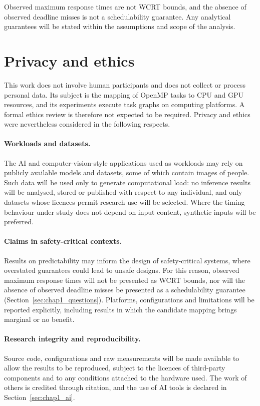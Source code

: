 Observed maximum response times are not WCRT bounds, and the absence of observed deadline misses is not a schedulability guarantee. Any analytical guarantees will be stated within the assumptions and scope of the analysis.

\section{Privacy and ethics}
\label{sec:chap1_ethics}
This work does not involve human participants and does not collect or process personal data. Its subject is the mapping of OpenMP tasks to CPU and GPU resources, and its experiments execute task graphs on computing platforms. A formal ethics review is therefore not expected to be required. Privacy and ethics were nevertheless considered in the following respects.

\paragraph{Workloads and datasets.} The AI and computer-vision-style applications used as workloads may rely on publicly available models and datasets, some of which contain images of people. Such data will be used only to generate computational load: no inference results will be analysed, stored or published with respect to any individual, and only datasets whose licences permit research use will be selected. Where the timing behaviour under study does not depend on input content, synthetic inputs will be preferred.

\paragraph{Claims in safety-critical contexts.} Results on predictability may inform the design of safety-critical systems, where overstated guarantees could lead to unsafe designs. For this reason, observed maximum response times will not be presented as WCRT bounds, nor will the absence of observed deadline misses be presented as a schedulability guarantee (Section~\ref{sec:chap1_questions}). Platforms, configurations and limitations will be reported explicitly, including results in which the candidate mapping brings marginal or no benefit.

\paragraph{Research integrity and reproducibility.} Source code, configurations and raw measurements will be made available to allow the results to be reproduced, subject to the licences of third-party components and to any conditions attached to the hardware used. The work of others is credited through citation, and the use of AI tools is declared in Section~\ref{sec:chap1_ai}.

